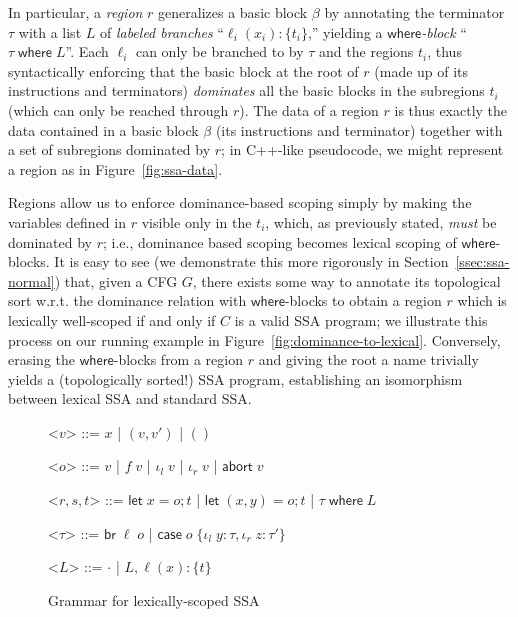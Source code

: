 \documentclass[acmsmall,screen,review]{acmart}
\newcommand{\ms}[1]{\ensuremath{\mathsf{#1}}}
\newcommand{\lto}{:}
\newcommand{\linl}[1]{\iota_l\;{#1}}
\newcommand{\linr}[1]{\iota_r\;{#1}}
\newcommand{\labort}[1]{\ms{abort}\;{#1}}
\newcommand{\letstmt}[3]{\ensuremath{\ms{let}\;#1 = #2; #3}}
\newcommand{\brb}[2]{\ms{br}\;#1\;#2}
\newcommand{\casestmt}[5]{\ms{case}\;#1\;\{\linl{#2} \lto #3, \linr{#4} \lto #5\}}
\newcommand{\where}[2]{#1\;\ms{where}\;#2}
\newcommand{\wbranch}[3]{#1(#2) \lto \{#3\}}
\begin{document}
In particular, a \emph{region} $r$ generalizes a basic block $\beta$ by annotating the terminator
$\tau$ with a list $L$ of \emph{labeled branches} ``$\wbranch{\ell_i}{x_i}{t_i}$,'' yielding a
\emph{\ms{where}-block} ``$\where{\tau}{L}$''. Each $\ell_i$ can only be branched to by $\tau$ and
the regions $t_i$, thus syntactically enforcing that the basic block at the root of $r$ (made up of
its instructions and terminators) \emph{dominates} all the basic blocks in the subregions $t_i$
(which can only be reached through $r$). The data of a region $r$ is thus exactly the data contained
in a basic block $\beta$ (its instructions and terminator) together with a set of subregions
dominated by $r$; in C++-like pseudocode, we might represent a region as in
Figure~\ref{fig:ssa-data}.

Regions allow us to enforce dominance-based scoping simply by making the variables defined in $r$
visible only in the $t_i$, which, as previously stated, \emph{must} be dominated by $r$; i.e.,
dominance based scoping becomes lexical scoping of \ms{where}-blocks. It is easy to see (we
demonstrate this more rigorously in Section~\ref{ssec:ssa-normal}) that, given a CFG $G$, there
exists some way to annotate its topological sort w.r.t. the dominance relation with
\ms{where}-blocks to obtain a region $r$ which is lexically well-scoped if and only if $C$ is a
valid SSA program; we illustrate this process on our running example in
Figure~\ref{fig:dominance-to-lexical}. Conversely, erasing the \ms{where}-blocks from a region $r$
and giving the root a name trivially yields a (topologically sorted!) SSA program, establishing an
isomorphism between lexical SSA and standard SSA.

\begin{figure}[H]
  \begin{center}
    \begin{grammar}
      <\(v\)> ::= \(x\) \;|\; \((v, v')\) \;|\; \(()\)

      <\(o\)> ::= \(v\) \;|\; \(f\;v\) \;|\; \(\linl{v}\) \;|\; \(\linr{v}\) \;|\; \(\labort{v}\)

      <\(r, s, t\)> ::=
        \(\letstmt{x}{o}{t}\)
        \;|\; \(\letstmt{(x, y)}{o}{t}\)
        \;|\; \(\where{\tau}{L}\)

      <\(\tau\)> ::= \(\brb{\ell}{o}\)
        \;|\; \(\casestmt{o}{y}{\tau}{z}{\tau'}\)

      <\(L\)> ::= \(\cdot\) \;|\; \(L, \wbranch{\ell}{x}{t}\)
    \end{grammar}
  \end{center}
  \caption{Grammar for lexically-scoped SSA} 
  \Description{}
  \label{fig:lex-ssa}
\end{figure} 
\end{document}
